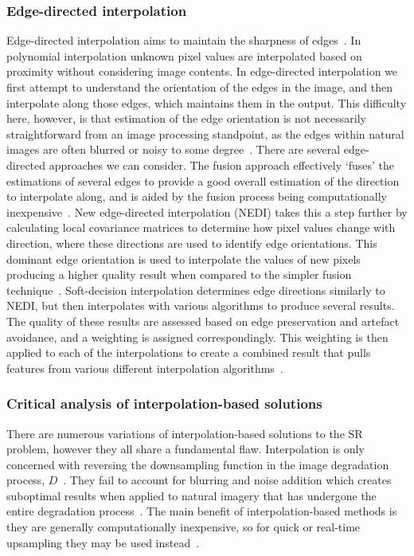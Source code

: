\subsubsection{Edge-directed interpolation}
Edge-directed interpolation aims to maintain the sharpness of edges~\cite{interpolation}. In polynomial interpolation unknown pixel values are interpolated based on proximity without considering image contents. In edge-directed interpolation we first attempt to understand the orientation of the edges in the image, and then interpolate along those edges, which maintains them in the output. This difficulty here, however, is that estimation of the edge orientation is not necessarily straightforward from an image processing standpoint, as the edges within natural images are often blurred or noisy to some degree~\cite{interpolation}. There are several edge-directed approaches we can consider. The fusion approach effectively `fuses' the estimations of several edges to provide a good overall estimation of the direction to interpolate along, and is aided by the fusion process being computationally inexpensive~\cite{interpolation}. New edge-directed interpolation (NEDI) takes this a step further by calculating local covariance matrices to determine how pixel values change with direction, where these directions are used to identify edge orientations. This dominant edge orientation is used to interpolate the values of new pixels producing a higher quality result when compared to the simpler fusion technique~\cite{interpolation}. Soft-decision interpolation determines edge directions similarly to NEDI, but then interpolates with various algorithms to produce several results. The quality of these results are assessed based on edge preservation and artefact avoidance, and a weighting is assigned correspondingly. This weighting is then applied to each of the interpolations to create a combined result that pulls features from various different interpolation algorithms~\cite{interpolation}.

\subsubsection{Critical analysis of interpolation-based solutions}
There are numerous variations of interpolation-based solutions to the SR problem, however they all share a fundamental flaw. Interpolation is only concerned with reversing the downsampling function in the image degradation process, $D$~\cite{interpolation}. They fail to account for blurring and noise addition which creates suboptimal results when applied to natural imagery that has undergone the entire degradation process~\cite{interpolation}. The main benefit of interpolation-based methods is they are generally computationally inexpensive, so for quick or real-time upsampling they may be used instead~\cite{interpolation}.

